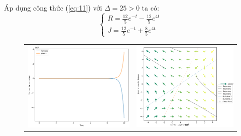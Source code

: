 \documentclass[a4paper]{article}
\begin{document}
\begin{enumerate}
\begin{itemize}
    Áp dụng công thức (\ref{eq:11}) với $\Delta = 25 > 0$ ta có:
    $$\begin{cases}
        R = \frac{12}{5}e^{-t} - \frac{12}{5}e^{4t} \\[3pt]
        J = \frac{12}{5}e^{-t} + \frac{8}{5}e^{4t}
    \end{cases}$$
    \begin{figure}[htp]
        \centering
        \begin{tabular}{cc}
            \includegraphics[scale = .33]{Images/Bt2/6.2_gr.png} &
            \includegraphics[scale = .33]{Images/Bt2/6.2_phase.png} \\

\end{tabular}
\end{figure}
\end{itemize}
\end{enumerate}
\end{document}
